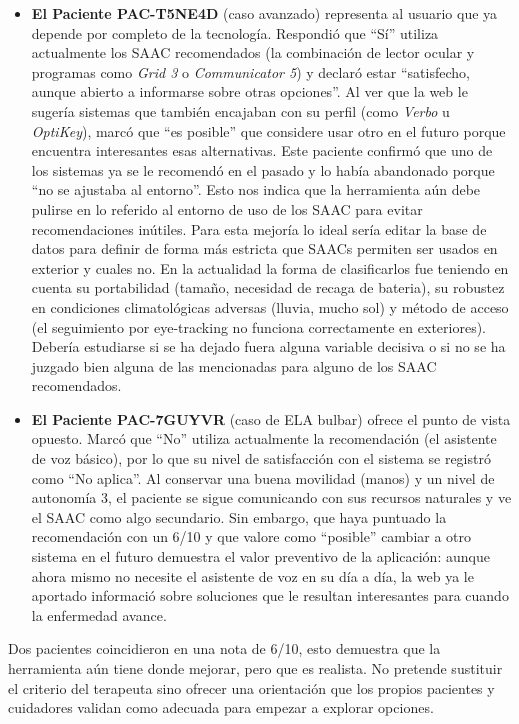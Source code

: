 \begin{itemize}
    	\item \textbf{El Paciente PAC-T5NE4D} (caso avanzado) representa al usuario que ya depende por completo de la tecnología. Respondió que ``Sí'' utiliza actualmente los SAAC recomendados (la combinación de lector ocular y programas como \textit{Grid 3} o \textit{Communicator 		5}) y declaró estar ``satisfecho, aunque abierto a informarse sobre otras opciones''. Al ver que la web le sugería sistemas que también encajaban con su perfil (como \textit{Verbo} u \textit{OptiKey}), marcó que ``es posible'' que considere usar otro en el futuro porque encuentra 			interesantes esas alternativas. 
    	Este paciente confirmó que uno de los sistemas ya se le recomendó en el pasado y lo había abandonado porque ``no se ajustaba al entorno''. Esto nos indica que la herramienta aún debe pulirse en lo referido al entorno de uso de los SAAC para evitar recomendaciones inútiles. 			Para esta mejoría lo ideal sería editar la base de datos para definir de forma más estricta que SAACs permiten ser usados en exterior y cuales no. En la actualidad la forma de clasificarlos fue teniendo en cuenta su portabilidad (tamaño, necesidad de recaga de bateria), su robustez 		en condiciones climatológicas adversas (lluvia, mucho sol) y método de acceso (el seguimiento por eye-tracking no funciona correctamente en exteriores). Debería estudiarse si se ha dejado fuera alguna variable decisiva o si no se ha juzgado bien alguna de las mencionadas para 		alguno de los SAAC recomendados.

    	\item \textbf{El Paciente PAC-7GUYVR} (caso de ELA bulbar) ofrece el punto de vista opuesto. Marcó que ``No'' utiliza actualmente la recomendación (el asistente de voz básico), por lo que su nivel de satisfacción con el sistema se registró como ``No aplica''. Al conservar una buena 		movilidad (manos) y un nivel de autonomía 3, el paciente se sigue comunicando con sus recursos naturales y ve el SAAC como algo secundario. 
    	Sin embargo, que haya puntuado la recomendación con un 6/10 y que valore como ``posible'' cambiar a otro sistema en el futuro demuestra el valor preventivo de la aplicación: aunque ahora mismo no necesite el asistente de voz en su día a día, la web ya le aportado informació 		sobre soluciones que le resultan interesantes para cuando la enfermedad avance.
\end{itemize}

Dos pacientes coincidieron en una nota de 6/10, esto demuestra que la herramienta aún tiene donde mejorar, pero que es realista. No pretende sustituir el criterio del terapeuta sino ofrecer una orientación que los propios pacientes y cuidadores validan como adecuada para empezar a explorar opciones.

